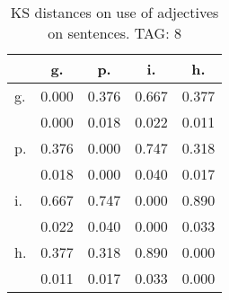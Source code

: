 \begin{table}[h!]
\begin{center}
\begin{tabular}{| l | c | c | c | c |}\hline
 & g. & p. & i. & h. \\\hline
g. & 0.000  & 0.376  & 0.667  & 0.377 \\\hline
 & 0.000  & 0.018  & 0.022  & 0.011 \\\hline
p. & 0.376  & 0.000  & 0.747  & 0.318 \\\hline
 & 0.018  & 0.000  & 0.040  & 0.017 \\\hline
i. & 0.667  & 0.747  & 0.000  & 0.890 \\\hline
 & 0.022  & 0.040  & 0.000  & 0.033 \\\hline
h. & 0.377  & 0.318  & 0.890  & 0.000 \\\hline
 & 0.011  & 0.017  & 0.033  & 0.000 \\\hline
\end{tabular}
\caption{KS distances on use of adjectives on sentences. TAG: 8}
\end{center}
\end{table}
